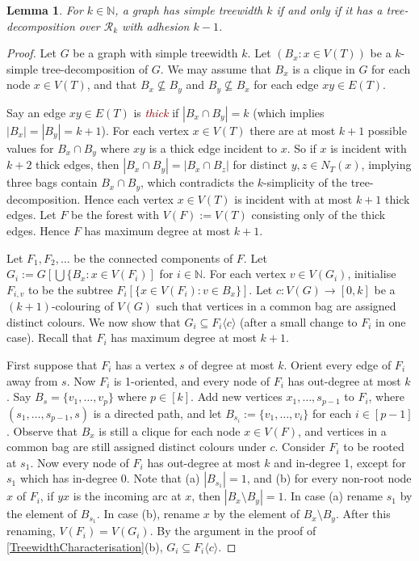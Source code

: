 \documentclass[a4paper,11pt]{article}
\newcommand{\defn}[1]{\textcolor{Maroon}{\emph{#1}}\index{#1}}
\theoremstyle{plain}
\newtheorem{lem}[thm]{Lemma}
\theoremstyle{definition}
\newcommand{\RR}{\mathcal{R}}
\newcommand{\NN}{\mathbb{N}}
\newcommand{\GGG}[2]{#1\langle{#2}\rangle}
\begin{document}
\begin{lem}
\label{SimpleTreewidthTreeDecomposition} 
For $k\in\NN$, a graph has simple treewidth $k$ if and only if it has a tree-decomposition over $\RR_k$ with adhesion $k-1$.
\end{lem}

\begin{proof}
Let $G$ be a graph with simple treewidth $k$. Let $(B_x:x\in V(T))$ be a $k$-simple tree-decomposition of $G$. We may assume that $B_x$ is a clique in $G$ for each node $x\in V(T)$, and that $B_x\not\subseteq B_y$ and  $B_y\not\subseteq B_x$ for each edge $xy\in E(T)$. 

Say an edge $xy\in E(T)$ is \defn{thick} if $|B_x\cap B_y|=k$ (which implies $|B_x|=|B_y|=k+1$). For each vertex $x\in V(T)$ there are at most $k+1$ possible values for $B_x\cap B_y$ where $xy$ is a thick edge incident to $x$. So if $x$ is incident with $k+2$ thick edges, then $|B_x\cap B_y|=|B_x\cap B_z|$ for distinct $y,z\in N_T(x)$, implying three bags contain $B_x\cap B_y$, which contradicts the $k$-simplicity of the tree-decomposition. Hence each vertex $x\in V(T)$ is incident with at most $k+1$ thick edges. Let $F$ be the forest with $V(F):=V(T)$ consisting only of the thick edges. Hence $F$ has maximum degree at most $k+1$. 

Let $F_1,F_2,\dots$ be the connected components of $F$. Let $G_i := G [ \bigcup\{ B_x : x\in V(F_i)]$ for $i\in\NN$. 
For each vertex $v\in V(G_i)$, initialise $F_{i,v}$ to be the subtree $F_i[ \{ x\in V(F_i): v \in B_x \} ]$. Let $c:V(G)\to[0,k]$ be a $(k+1)$-colouring of $V(G)$ such that vertices in a common bag are assigned distinct colours. We now show that $G_i \subseteq \GGG{F_i}{c}$ (after a small change to $F_i$ in one case). 
Recall that $F_i$ has maximum degree at most $k+1$. 

First suppose that $F_i$ has a vertex $s$ of degree at most $k$. Orient every edge of $F_i$ away from $s$. Now $F_i$ is 1-oriented, and every node of $F_i$ has out-degree at most $k$. Say $B_s=\{v_1,\dots,v_p\}$ where $p\in[k]$. Add new vertices $x_1,\dots,s_{p-1}$ to $F_i$, where  $(s_1,\dots,s_{p-1},s)$ is a directed path, and let $B_{s_i}:=\{v_1,\dots,v_i\}$ for each $i\in[p-1]$. Observe that $B_x$ is still a clique for each node $x\in V(F)$, and vertices in a common bag are still assigned distinct colours under $c$. Consider $F_i$ to be rooted at $s_1$. Now every node of $F_i$ has out-degree at most $k$ and in-degree 1, except for $s_1$ which has in-degree 0. Note that (a) $|B_{s_1}|=1$, and (b) for every non-root node $x$ of $F_i$, if $yx$ is the incoming arc at $x$, then $|B_x\setminus B_y|=1$. In case (a) rename $s_1$ by the element of $B_{s_1}$. In case (b), rename $x$ by the element of $B_x\setminus B_y$. After this renaming, $V(F_i)=V(G_i)$. By the argument in the proof of \cref{TreewidthCharacterisation}(b), $G_i \subseteq \GGG{F_i}{c}$. 


\end{proof}
\end{document}
